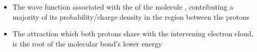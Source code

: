 \begin{frame}
\frametitle{\texorpdfstring{\culine[\sectiontitleulinecolor]{\sectiontitle}}{\sectiontitle} }

\begin{itemize}
	\item The wave function associated with the  of the molecule , contributing a majority of its probability/charge density in the region between the protons

\item The attraction which both protons share with the intervening electron cloud, is the root of the molecular bond's lower energy
\end{itemize}


\endofslide 
\end{frame}

